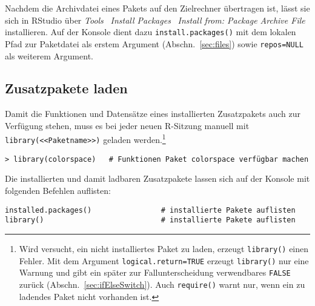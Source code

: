 Nachdem die Archivdatei eines Pakets auf den Zielrechner übertragen ist, lässt sie sich in RStudio über \emph{Tools} \textrightarrow\ \emph{Install Packages} \textrightarrow\ \emph{Install from: Package Archive File} installieren. Auf der Konsole dient dazu \lstinline!install.packages()! mit dem lokalen Pfad zur Paketdatei als erstem Argument (Abschn.\ \ref{sec:files}) sowie \lstinline!repos=NULL! als weiterem Argument.

\subsection{Zusatzpakete laden}
\label{sec:packages_library}

Damit die Funktionen und Datensätze eines installierten Zusatzpakets auch zur Verfügung stehen, muss es bei jeder neuen R-Sitzung manuell mit \lstinline!library(<<Paketname>>)! geladen werden.\footnote{Wird versucht, ein nicht installiertes Paket zu laden, erzeugt \lstinline!library()! einen Fehler. Mit dem Argument \lstinline!logical.return=TRUE! erzeugt \lstinline!library()! nur eine Warnung und gibt ein später zur Fallunterscheidung verwendbares \lstinline!FALSE! zurück (Abschn.\ \ref{sec:ifElseSwitch}). Auch \lstinline!require()! warnt nur, wenn ein zu ladendes Paket nicht vorhanden ist.}
\begin{lstlisting}
> library(colorspace)   # Funktionen Paket colorspace verfügbar machen
\end{lstlisting}

Die installierten und damit ladbaren Zusatzpakete lassen sich auf der Konsole mit folgenden Befehlen auflisten:
\begin{lstlisting}
installed.packages()                # installierte Pakete auflisten
library()                           # installierte Pakete auflisten
\end{lstlisting}


